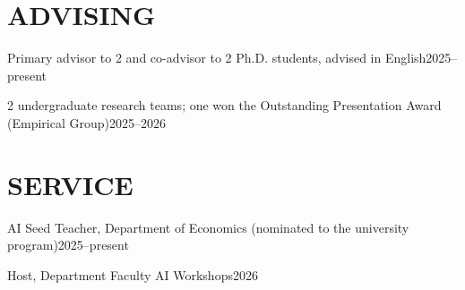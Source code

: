 \documentclass{article}
\newcommand{\cvsection}[1]{\section*{\MakeUppercase{#1}}}
\begin{document}
\cvsection{Advising}

\begin{cvlist}
    \item Primary advisor to 2 and co-advisor to 2 Ph.D. students, advised in English\hfill 2025--present
    \item 2 undergraduate research teams; one won the Outstanding Presentation Award (Empirical Group)\hfill 2025--2026
\end{cvlist}


\cvsection{Service}

\begin{cvlist}
    \item AI Seed Teacher, Department of Economics (nominated to the university program)\hfill 2025--present
    \item Host, Department Faculty AI Workshops\hfill 2026
\end{cvlist}



















\end{document}
